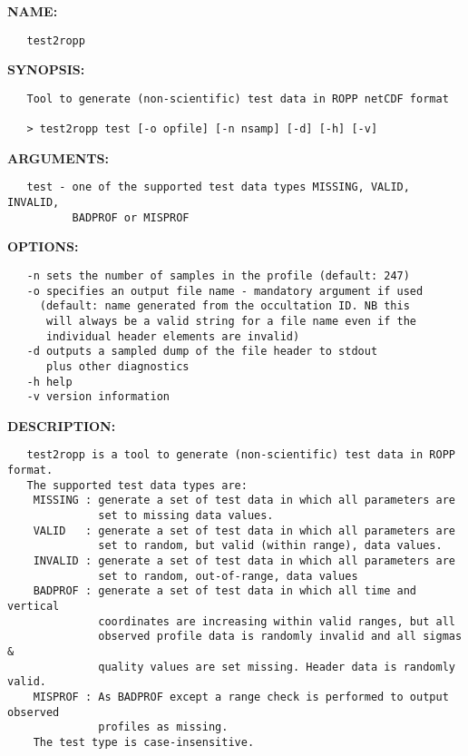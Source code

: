 \label{ch:robo89}
\label{ch:Programs_test2ropp}
\textbf{NAME:}\hspace{0.08in}\begin{Verbatim}
   test2ropp
\end{Verbatim}
\textbf{SYNOPSIS:}\hspace{0.08in}\begin{Verbatim}
   Tool to generate (non-scientific) test data in ROPP netCDF format

   > test2ropp test [-o opfile] [-n nsamp] [-d] [-h] [-v]
\end{Verbatim}
\textbf{ARGUMENTS:}\hspace{0.08in}\begin{Verbatim}
   test - one of the supported test data types MISSING, VALID, INVALID,
          BADPROF or MISPROF
\end{Verbatim}
\textbf{OPTIONS:}\hspace{0.08in}\begin{Verbatim}
   -n sets the number of samples in the profile (default: 247)
   -o specifies an output file name - mandatory argument if used
     (default: name generated from the occultation ID. NB this
      will always be a valid string for a file name even if the
      individual header elements are invalid)
   -d outputs a sampled dump of the file header to stdout
      plus other diagnostics
   -h help
   -v version information
\end{Verbatim}
\textbf{DESCRIPTION:}\hspace{0.08in}\begin{Verbatim}
   test2ropp is a tool to generate (non-scientific) test data in ROPP format.
   The supported test data types are:
    MISSING : generate a set of test data in which all parameters are
              set to missing data values.
    VALID   : generate a set of test data in which all parameters are
              set to random, but valid (within range), data values.
    INVALID : generate a set of test data in which all parameters are
              set to random, out-of-range, data values
    BADPROF : generate a set of test data in which all time and vertical
              coordinates are increasing within valid ranges, but all
              observed profile data is randomly invalid and all sigmas &
              quality values are set missing. Header data is randomly valid.
    MISPROF : As BADPROF except a range check is performed to output observed
              profiles as missing.
    The test type is case-insensitive.
\end{Verbatim}
